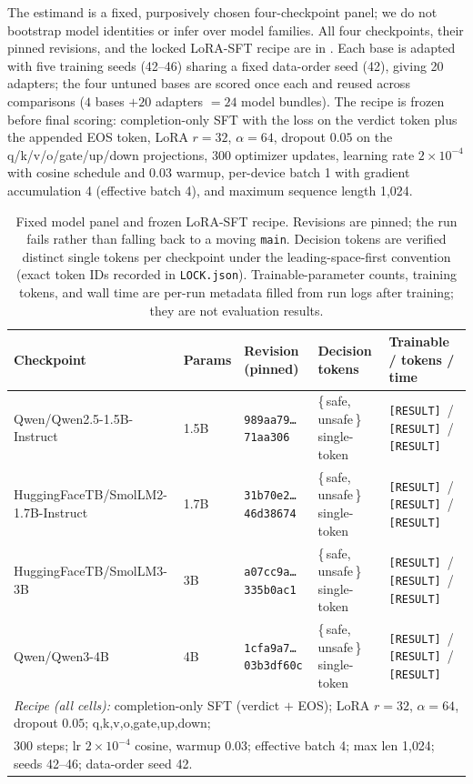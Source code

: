 \documentclass[sigconf,nonacm]{acmart}
\newcommand{\RES}{\texttt{[RESULT]}}
\begin{document}
The estimand is a fixed, purposively chosen four-checkpoint panel; we do not bootstrap model identities or infer over model families. All four checkpoints, their pinned revisions, and the locked LoRA-SFT recipe are in . Each base is adapted with five training seeds (42--46) sharing a fixed data-order seed (42), giving 20 adapters; the four untuned bases are scored once each and reused across comparisons ($4$ bases $+ 20$ adapters $= 24$ model bundles). The recipe is frozen before final scoring: completion-only SFT with the loss on the verdict token plus the appended EOS token, LoRA $r{=}32$, $\alpha{=}64$, dropout $0.05$ on the q/k/v/o/gate/up/down projections, 300 optimizer updates, learning rate $2\times10^{-4}$ with cosine schedule and 0.03 warmup, per-device batch 1 with gradient accumulation 4 (effective batch 4), and maximum sequence length 1{,}024.

\begin{table}[t]
\centering
\small
\caption{Fixed model panel and frozen LoRA-SFT recipe. Revisions are pinned; the run fails rather than falling back to a moving \texttt{main}. Decision tokens are verified distinct single tokens per checkpoint under the leading-space-first convention (exact token IDs recorded in \texttt{LOCK.json}). Trainable-parameter counts, training tokens, and wall time are per-run metadata filled from run logs after training; they are not evaluation results.}
\label{tab:panel-recipe}
\begin{tabular}{lllll}
\toprule
Checkpoint & Params & Revision (pinned) & Decision tokens & Trainable / tokens / time \\
\midrule
Qwen/Qwen2.5-1.5B-Instruct & 1.5B & \texttt{989aa79\ldots71aa306} & \{\,safe, unsafe\,\} single-token & \RES\ / \RES\ / \RES \\
HuggingFaceTB/SmolLM2-1.7B-Instruct & 1.7B & \texttt{31b70e2\ldots46d38674} & \{\,safe, unsafe\,\} single-token & \RES\ / \RES\ / \RES \\
HuggingFaceTB/SmolLM3-3B & 3B & \texttt{a07cc9a\ldots335b0ac1} & \{\,safe, unsafe\,\} single-token & \RES\ / \RES\ / \RES \\
Qwen/Qwen3-4B & 4B & \texttt{1cfa9a7\ldots03b3df60c} & \{\,safe, unsafe\,\} single-token & \RES\ / \RES\ / \RES \\
\midrule
\multicolumn{5}{l}{\emph{Recipe (all cells):} completion-only SFT (verdict $+$ EOS); LoRA $r{=}32$, $\alpha{=}64$, dropout $0.05$; q,k,v,o,gate,up,down;}\\
\multicolumn{5}{l}{\phantom{\emph{Recipe (all cells):}} 300 steps; lr $2\times10^{-4}$ cosine, warmup 0.03; effective batch 4; max len 1{,}024; seeds 42--46; data-order seed 42.}\\
\bottomrule
\end{tabular}
\end{table}
\end{document}
